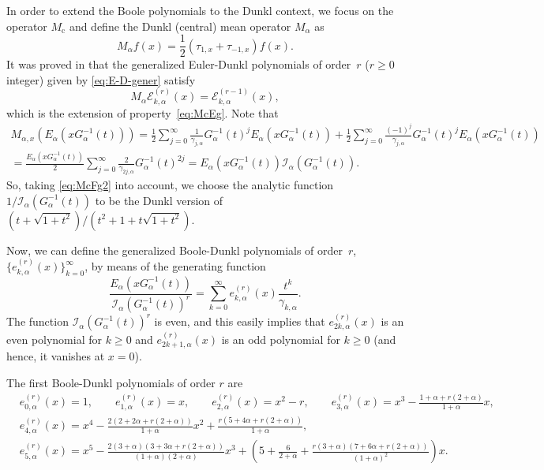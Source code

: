 \documentclass[11pt]{article}
\theoremstyle{plain}
\theoremstyle{remark}
\numberwithin{equation}{section} %
\newcommand{\Ea}{E_{\alpha}}
\newcommand{\I}{\mathcal{I}}
\newcommand{\E}{\mathcal{E}}
\begin{document}
In order to extend the Boole polynomials to the Dunkl context, we focus on the operator $M_{\mathrm{c}}$ and define the Dunkl (central) mean operator $M_{\alpha}$ as
\[
  M_{\alpha}f(x) = \frac{1}{2}(\tau_{1,x}+\tau_{-1,x})f(x).
\]
It was proved in \cite[Theorem~8.5]{CMV} that the generalized Euler-Dunkl polynomials of order~$r$ ($r\ge 0$ integer) given by \eqref{eq:E-D-gener} satisfy
\[
  M_{\alpha}\E^{(r)}_{k,\alpha}(x) = \E^{(r-1)}_{k,\alpha}(x),
\]
which is the extension of property~\eqref{eq:McEg}.
Note that
\begin{multline*}
  M_{\alpha,x}(\Ea(xG_{\alpha}^{-1}(t)))
  = \frac{1}{2} \sum_{j=0}^{\infty} \frac{1}{\gamma_{j,\alpha}}G_{\alpha}^{-1}(t)^j \Ea(xG_{\alpha}^{-1}(t))
  + \frac{1}{2} \sum_{j=0}^{\infty} \frac{(-1)^j}{\gamma_{j,\alpha}}G_{\alpha}^{-1}(t)^j 
  \Ea(xG_{\alpha}^{-1}(t)) \\
  = \frac{\Ea(xG_{\alpha}^{-1}(t))}{2} \sum_{j=0}^{\infty} \frac{2}{\gamma_{2j,\alpha}}
  G_{\alpha}^{-1}(t)^{2j}
  = \Ea(xG_{\alpha}^{-1}(t))\I_{\alpha}(G_{\alpha}^{-1}(t)).
\end{multline*}
So, taking \eqref{eq:McFg2} into account, we choose the analytic function $1/\I_{\alpha}(G_{\alpha}^{-1}(t))$ to be the Dunkl version of $(t+\sqrt{1+t^2})/(t^2+1+t\sqrt{1+t^2})$.

Now, we can define the generalized Boole-Dunkl polynomials of order~$r$, $\{e^{(r)}_{k,\alpha}(x)\}_{k=0}^{\infty}$, by means of the generating function
\begin{equation}
\label{eq:Boole-D-GF}
  \frac{\Ea(xG_{\alpha}^{-1}(t))}{\I_{\alpha}(G_{\alpha}^{-1}(t))^r}
  = \sum_{k=0}^{\infty} e^{(r)}_{k,\alpha}(x) \frac{t^k}{\gamma_{k,\alpha}}.
\end{equation}
The function $\I_{\alpha}(G_{\alpha}^{-1}(t))^r$ is even, and this easily implies that
$e_{2k,\alpha}^{(r)}(x)$ is an even polynomial for $k\geq 0$ and $e^{(r)}_{2k+1,\alpha}(x)$ is an odd polynomial for $k\geq 0$ (and hence, it vanishes at $x=0$). 

The first Boole-Dunkl polynomials of order $r$ are
\begin{align*}
  & e^{(r)}_{0,\alpha}(x) = 1, \qquad
  e^{(r)}_{1,\alpha}(x) = x, \qquad
  e^{(r)}_{2,\alpha}(x) = x^2 - r, \qquad
  e^{(r)}_{3,\alpha}(x) = x^3 - \frac{1+\alpha+r(2+\alpha)}{1+\alpha}x, \\
  & e^{(r)}_{4,\alpha}(x) = x^4 - \frac{2(2+2\alpha+r(2+\alpha))}{1+\alpha} x^2 + 
  \frac{r(5+4\alpha+r(2+\alpha))}{1+\alpha}, \\
  & e^{(r)}_{5,\alpha}(x) = x^5 - \frac{2(3+\alpha)(3+3\alpha+r(2+\alpha))}{(1+\alpha)(2+\alpha)} x^3
  + \left(5 + \frac{6}{2+\alpha} + \frac{r(3+\alpha)(7+6\alpha+r(2+\alpha))}{(1+\alpha)^2}\right) x.
\end{align*}
\end{document}

